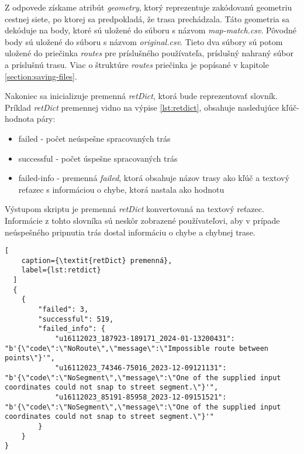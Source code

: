 Z odpovede získame atribút \textit{geometry}, ktorý reprezentuje zakódovanú geometriu cestnej siete, po ktorej sa predpokladá, že trasa prechádzala. Táto geometria sa dekóduje na body, ktoré sú uložené do súboru s názvom \textit{map-match.csv}. Pôvodné body sú uložené do súboru s názvom \textit{original.csv}. Tieto dva súbory sú potom uložené do priečinka \textit{routes} pre príslušného používateľa, príslušný nahraný súbor a príslušnú trasu. Viac o štruktúre \textit{routes} priečinka je popísané v kapitole \ref{section:saving-files}.

Nakoniec sa inicializuje premenná \textit{retDict}, ktorá bude reprezentovať slovník. Príklad \textit{retDict} premennej vidno na výpise \ref{lst:retdict}, obsahuje nasledujúce kľúč-hodnota páry:
\begin{itemize}
    \item failed -  počet neúspešne spracovaných trás
    \item successful - počet úspešne spracovaných trás
    \item failed-info - premenná \textit{failed}, ktorá obsahuje názov trasy ako kľúč a textový reťazec s informáciou o chybe, ktorá nastala ako hodnotu
\end{itemize}
Výstupom skriptu je premenná \textit{retDict} konvertovaná na textový reťazec. Informácie z tohto slovníka sú neskôr zobrazené používateľovi, aby v prípade neúspešného pripnutia trás dostal informáciu o chybe a chybnej trase.




\begin{lstlisting}[
    caption={\textit{retDict} premenná},
    label={lst:retdict}
  ]
  {
    {
        "failed": 3,
        "successful": 519,
        "failed_info": {
            "u16112023_187923-189171_2024-01-13200431": "b'{\"code\":\"NoRoute\",\"message\":\"Impossible route between points\"}'",
            "u16112023_74346-75016_2023-12-09121131": "b'{\"code\":\"NoSegment\",\"message\":\"One of the supplied input coordinates could not snap to street segment.\"}'",
            "u16112023_85191-85958_2023-12-09151521": "b'{\"code\":\"NoSegment\",\"message\":\"One of the supplied input coordinates could not snap to street segment.\"}'"
        }
    }
}
  \end{lstlisting}







